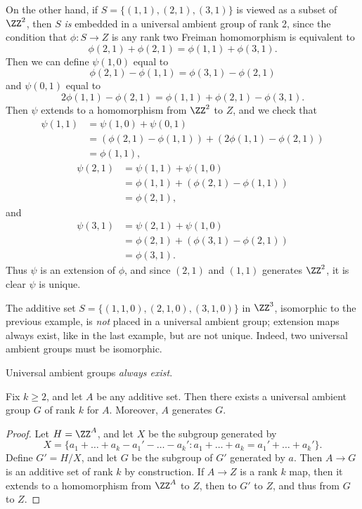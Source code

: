\begin{example}
    On the other hand, if $S = \{ (1,1), (2,1), (3,1) \}$ is viewed as a subset of $\ZZ^2$, then $S$ \emph{is} embedded in a universal ambient group of rank 2, since the condition that $\phi: S \to Z$ is any rank two Freiman homomorphism is equivalent to
    \[ \phi(2,1) + \phi(2,1) = \phi(1,1) + \phi(3,1). \]
    Then we can define $\psi(1,0)$ equal to
    \[ \phi(2,1) - \phi(1,1) = \phi(3,1) - \phi(2,1) \]
    and $\psi(0,1)$ equal to
    \[ 2\phi(1,1) - \phi(2,1) = \phi(1,1) + \phi(2,1) - \phi(3,1). \]
    Then $\psi$ extends to a homomorphism from $\ZZ^2$ to $Z$, and we check that
    \begin{align*}
        \psi(1,1) &= \psi(1,0) + \psi(0,1)\\
        &= (\phi(2,1) - \phi(1,1)) + (2\phi(1,1) - \phi(2,1))\\
        &= \phi(1,1),
    \end{align*}
    \begin{align*}
        \psi(2,1) &= \psi(1,1) + \psi(1,0)\\
        &= \phi(1,1) + (\phi(2,1) - \phi(1,1))\\
        &= \phi(2,1),
    \end{align*}
    and
    \begin{align*}
        \psi(3,1) &= \psi(2,1) + \psi(1,0)\\
        &= \phi(2,1) + (\phi(3,1) - \phi(2,1))\\
        &= \phi(3,1).
    \end{align*}
    Thus $\psi$ is an extension of $\phi$, and since $(2,1)$ and $(1,1)$ generates $\ZZ^2$, it is clear $\psi$ is unique.
\end{example}

\begin{example}
    The additive set $S = \{ (1,1,0),(2,1,0),(3,1,0) \}$ in $\ZZ^3$, isomorphic to the previous example, is \emph{not} placed in a universal ambient group; extension maps always exist, like in the last example, but are not unique. Indeed, two universal ambient groups must be isomorphic.
\end{example}

Universal ambient groups \emph{always exist}.

\begin{theorem}
    Fix $k \geq 2$, and let $A$ be any additive set. Then there exists a universal ambient group $G$ of rank $k$ for $A$. Moreover, $A$ generates $G$.
\end{theorem}
\begin{proof}
    Let $H = \ZZ^A$, and let $X$ be the subgroup generated by
    \[ X = \{ a_1 + \dots + a_k - a_1' - \dots - a_k' : a_1 + \dots + a_k = a_1' + \dots + a_k' \}. \]
    Define $G' = H/X$, and let $G$ be the subgroup of $G'$ generated by $a$. Then $A \to G$ is an additive set of rank $k$ by construction. If $A \to Z$ is a rank $k$ map, then it extends to a homomorphism from $\ZZ^A$ to $Z$, then to $G'$ to $Z$, and thus from $G$ to $Z$.
\end{proof}

